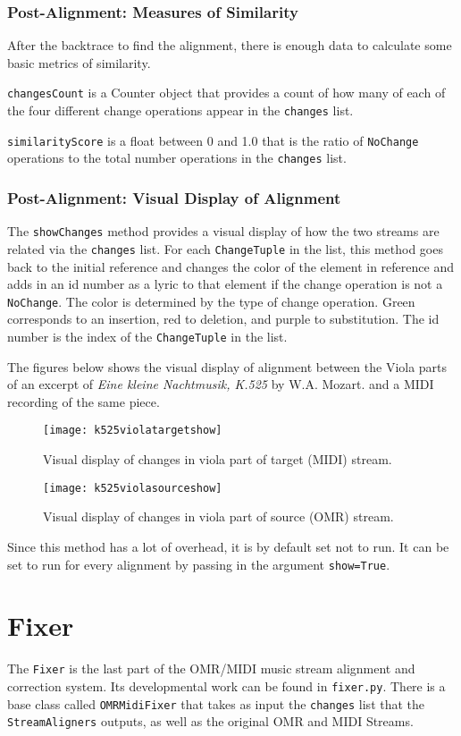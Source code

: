 \subsubsection{Post-Alignment: Measures of Similarity}
After the backtrace to find the alignment, there is enough data to calculate some basic metrics of similarity. 

\texttt{changesCount} is a Counter object that provides a count of how many of each of the four different change operations appear in the \texttt{changes} list. 

\texttt{similarityScore} is a float between 0 and 1.0 that is the ratio of \texttt{NoChange} operations to the total number operations in the \texttt{changes} list.
\subsubsection{Post-Alignment: Visual Display of Alignment}
The \texttt{showChanges} method provides a visual display of how the two streams are related via the \texttt{changes} list. For each \texttt{ChangeTuple} in the list, this method goes back to the initial reference and changes the color of the element in reference and adds in an id number as a lyric to that element if the change operation is not a \texttt{NoChange}. The color is determined by the type of change operation. Green corresponds to an insertion, red to deletion, and purple to substitution. The id number is the index of the \texttt{ChangeTuple} in the list. 

The figures below shows the visual display of alignment between the Viola parts of an excerpt of \textit{Eine kleine Nachtmusik, K.525} by W.A. Mozart. and a MIDI recording of the same piece.
\begin{figure}[H]
\centering
\texttt{[image: k525violatargetshow]}
\caption{Visual display of changes in viola part of target (MIDI) stream.}
\end{figure}

\begin{figure}[H]
\centering
\texttt{[image: k525violasourceshow]}
\caption{Visual display of changes in viola part of source (OMR) stream.}
\end{figure}

Since this method has a lot of overhead, it is by default set not to run. It can be set to run for every alignment by passing in the argument \texttt{show=True}. 

\section{Fixer} \label{fixer}
The \texttt{Fixer} is the last part of the OMR/MIDI music stream alignment and correction system. Its developmental work can be found in \texttt{fixer.py}. There is a base class called \texttt{OMRMidiFixer} that takes as input the \texttt{changes} list that the \texttt{StreamAligners} outputs, as well as the original OMR and MIDI Streams.

